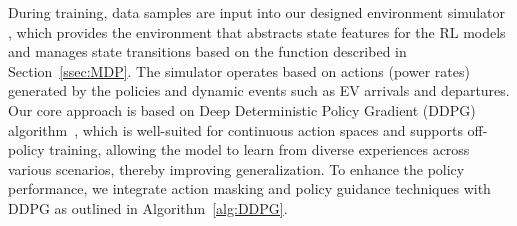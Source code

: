 During training, data samples are input into our designed environment simulator , which provides the environment that abstracts state features for the RL models and manages state transitions based on the function described in Section~\ref{ssec:MDP}. The simulator operates based on actions (power rates) generated by the policies and dynamic events such as EV arrivals and departures. 
Our core approach is based on  Deep Deterministic Policy Gradient (DDPG) algorithm~\cite{lillicrap2015continuous}, which  is well-suited for continuous action spaces and supports off-policy training, allowing the model to learn from diverse experiences across various scenarios, thereby improving generalization. To enhance the policy performance, we integrate action masking and policy guidance techniques with DDPG as outlined in Algorithm~\ref{alg:DDPG}.  

